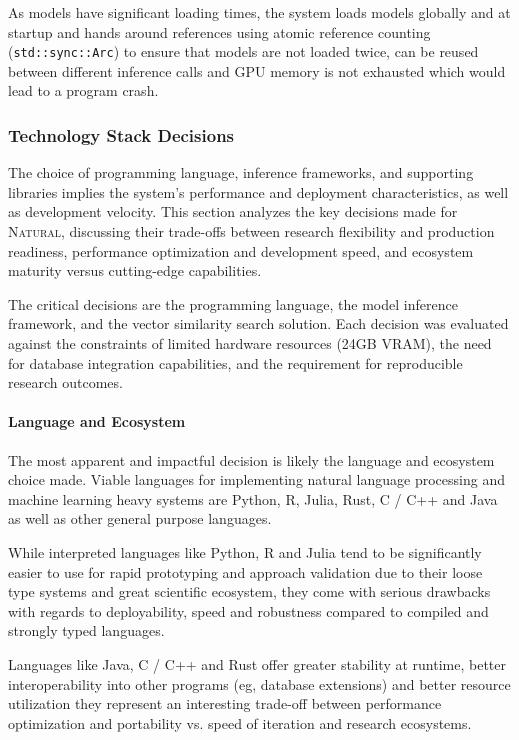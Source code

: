 As models have significant loading times, the system loads models globally and 
at startup and hands around references using atomic reference counting
(\texttt{std::sync::Arc}) to ensure that models are not loaded twice, can be
reused between different inference calls and GPU memory is not exhausted which
would lead to a program crash.

\subsubsection{Technology Stack Decisions}

The choice of programming language, inference frameworks, and supporting
libraries implies the system's performance and deployment characteristics,
as well as development velocity. This section analyzes the key decisions
made for \textsc{Natural}, discussing their trade-offs between research
flexibility and production readiness, performance optimization and development
speed, and ecosystem maturity versus cutting-edge capabilities.

The critical decisions are the programming language, the model
inference framework, and the vector similarity search solution. Each
decision was evaluated against the constraints of limited hardware resources
(24GB VRAM), the need for database integration capabilities, and the
requirement for reproducible research outcomes.

\paragraph{Language and Ecosystem}

The most apparent and impactful decision is likely the language and ecosystem
choice made. Viable languages for implementing natural language processing and
machine learning heavy systems are Python, R, Julia, Rust, C / C++ and Java as
well as other general purpose languages.

While interpreted languages like Python, R and Julia tend to be significantly
easier to use for rapid prototyping and approach validation due to their loose
type systems and great scientific ecosystem, they come with serious drawbacks
with regards to deployability, speed and robustness compared to compiled and
strongly typed languages.

Languages like Java, C / C++ and Rust offer greater stability at runtime,
better interoperability into other programs (eg, database extensions) and better
resource utilization they represent an interesting trade-off between performance
optimization and portability vs. speed of iteration and research ecosystems.

